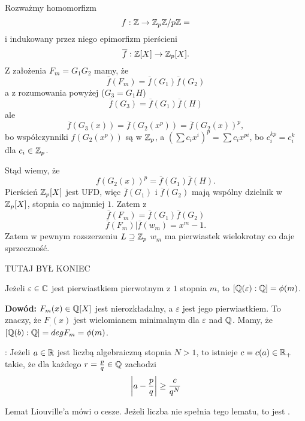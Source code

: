 Rozważmy homomorfizm
$$f:\mathbb{Z}\to\mathbb{Z}_p\mathbb{Z}/p\mathbb{Z}=$$
i indukowany przez niego epimorfizm pierścieni
$$\overline f:\mathbb{Z}[X]\to\mathbb{Z}_p[X].$$
Z założenia $F_m=G_1G_2$ mamy, że
$$\overline f(F_m)=\overline f(G_1)\overline f(G_2)$$
a z rozumowania powyżej ($G_3=G_1H$)
$$\overline f(G_3)=\overline f(G_1)\overline f(H)$$
ale
$$\overline f(G_3(x))=\overline f(G_2(x^p))=\overline f(G_2(x))^p,$$
bo współczynniki $f(G_2(x^p))$ są w $\mathbb{Z}_p$, a $(\sum c_ix^i)^p=\sum c_ix^{pi}$, bo $c_i^{kp}=c_i^k$ dla $c_i\in\mathbb{Z}_p$.

Stąd wiemy, że
$$f(G_2(x))^p=\overline f(G_1)\overline f(H).$$
Pierścień $\mathbb{Z}_p[X]$ jest UFD, więc $\overline f(G_1)$ i $\overline f(G_2)$ mają wspólny dzielnik w $\mathbb{Z}_p[X]$, stopnia co najmniej $1$. Zatem z
$$\overline f(F_m)=\overline f(G_1)\overline f(G_2)$$
$$\overline f(F_m)|\overline f(w_m)=x^m-1.$$
Zatem w pewnym rozszerzeniu $L\supseteq\mathbb{Z}_p$ $w_m$ ma pierwiastek wielokrotny co daje sprzeczność.

{\large\color{orange}TUTAJ BYŁ KONIEC}

\begin{wniosek}
    Jeżeli $\varepsilon\in\mathbb{C}$ jest pierwiastkiem pierwotnym z $1$ stopnia $m$, to $[\mathbb{Q}(\varepsilon):\mathbb{Q}]=\phi(m)$.
\end{wniosek}

\textbf{Dowód:} $F_m(x)\in\mathbb{Q}[X]$ jest nierozkładalny, a $\varepsilon$ jest jego pierwiastkiem. To znaczy, że $F_,(x)$ jest wielomianem minimalnym dla $\varepsilon$ nad $\mathbb{Q}$. Mamy, że $[\mathbb{Q}(b):\mathbb{Q}]=deg F_m=\phi(m)$.

\begin{lemat} : Jeżeli $a\in\mathbb{R}$ jest liczbą algebraiczną stopnia $N>1$, to istnieje $c=c(a)\in\mathbb{R}_+$ takie, że dla każdego $r=\frac pq\in\mathbb{Q}$ zachodzi
    $$\left|a-\frac pq\right|\geq{c\over q^N}$$
\end{lemat}

Lemat Liouville'a mówi o cesze. Jeżeli liczba nie spełnia tego lematu, to jest .

